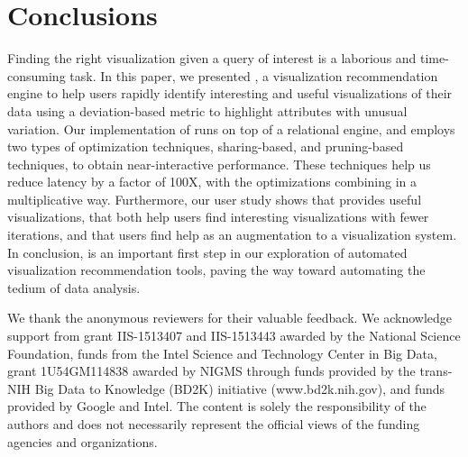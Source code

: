 
\section{Conclusions}
\label{sec:conc}

Finding the right visualization given a query of interest is a
laborious and time-consuming task.
In this paper, we presented \SeeDB, a visualization recommendation
engine to help users 
rapidly identify interesting and useful visualizations of their data using a deviation-based 
metric to highlight attributes with unusual variation.
Our implementation of \SeeDB runs on top of a relational engine, and employs two types of optimization 
techniques, sharing-based, and pruning-based techniques, to obtain near-interactive performance.
These techniques help us reduce latency by a factor of 100X, with the optimizations combining in a multiplicative way. 
Furthermore, our user study shows that \SeeDB provides useful
visualizations, that both help users find interesting visualizations with fewer iterations, and that
users find help as an augmentation to a visualization system.
In conclusion, \SeeDB is an important first step in our exploration of 
automated visualization recommendation tools, 
paving the way toward automating the tedium of data analysis.

We thank the anonymous reviewers for their valuable feedback. We acknowledge support from grant IIS-1513407 and IIS-1513443 awarded by the National Science Foundation, funds from the Intel Science and Technology Center in Big Data, 
grant 1U54GM114838 awarded by NIGMS through funds provided by the trans-NIH Big Data to Knowledge (BD2K) initiative \break 
(www.bd2k.nih.gov), and funds provided by Google and Intel. The content is solely the responsibility of the authors and does not necessarily represent the official views of the funding agencies and organizations.



